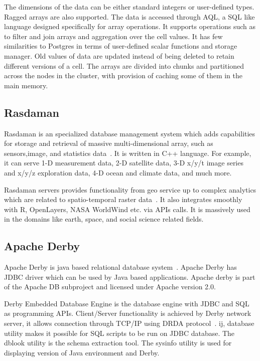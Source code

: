      The dimensions of the data can be either standard integers or user-defined
     types. Ragged arrays are also supported. The data is accessed through AQL,
     a SQL like language designed specifically for array operations. It
     supports operations such as to filter and join arrays and aggregation over
     the cell values. It has few similarities to Postgres in terms of
     user-defined scalar functions and storage manager. Old values of data are
     updated instead of being deleted to retain different versions of a cell.
     The arrays are divided into chunks and partitioned across the nodes in the
     cluster, with provision of caching some of them in the main memory.

     \pv

\subsection{Rasdaman}

Rasdaman is an specialized database management system which adds
capabilities for storage and retrieval of massive multi-dimensional
array, such as sensors,image, and statistics
data~\cite{www-rasdaman-wiki}. It is written in C++ language. For
example, it can serve 1-D measurement data, 2-D satellite data, 3-D
x/y/t image series and x/y/z exploration data, 4-D ocean and climate
data, and much more.

Rasdaman servers provides functionality from geo service up to complex
analytics which are related to spatio-temporal raster
data~\cite{www-rasdaman-official}.  It also integrates smoothly with
R, OpenLayers, NASA WorldWind etc. via APIs calls. It is massively
used in the domains like earth, space, and social science related
fields.

     \pv
     
\subsection{Apache Derby}

Apache Derby is java based relational database
system~\cite{www-apachederby}. Apache Derby has JDBC driver which can
be used by Java based applications. Apache derby is part of the Apache
DB subproject and licensed under Apache version 2.0.

Derby Embedded Database Engine is the database engine with JDBC and
SQL as programming APIs.  Client/Server functionality is achieved by
Derby network server, it allows connection through TCP/IP using DRDA
protocol~\cite{www-apachederbycharter}. ij, database utility makes it
possible for SQL scripts to be run on JDBC database. The dblook
utility is the schema extraction tool. The sysinfo utility is used for
displaying version of Java environment and Derby.

